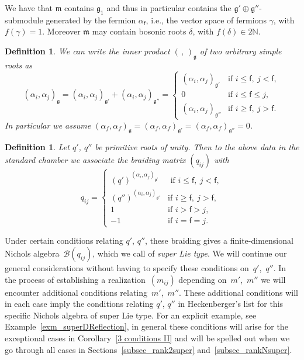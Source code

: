 \documentclass[pdftex]{sigma}%
\numberwithin{equation}{section}
\newtheorem{defin}[teo]{Definition}
\newcommand{\N}{\mathbb{N}}
\newcommand{\f}{\mathsf{f}}
\begin{document}
We have that $\mathfrak{m}$ contains $\mathfrak{g_1}$ and thus in particular contains the $\mathfrak{g'} \oplus \mathfrak{g''}$-submodule generated by the fermion $\alpha_\f$, i.e., the vector space of fermions $\gamma$, with $f(\gamma) =1$.
Moreover $\mathfrak{m}$ may contain bosonic roots $\delta$, with $f(\delta)\in 2\N$.
\begin{defin}We can write the inner product $\left( \,,\,\right)_\mathfrak{g}$ of two arbitrary simple roots as \[(\alpha_{i}, \alpha_{j})_\mathfrak{g} = (\alpha_{i}, \alpha_{j})_\mathfrak{g'}+(\alpha_{i}, \alpha_{j})_\mathfrak{g''}= \begin{cases} (\alpha_{i}, \alpha_{j})_\mathfrak{g'}& \text{if } i \leq \f ,\  j < \f, \\
0 & \text{if } i \leq \f \leq j, \\
(\alpha_{i}, \alpha_{j})_\mathfrak{g''}& \text{if } i \geq \f ,\  j > \f.
\end{cases}\]
In particular we assume $(\alpha_{f}, \alpha_{f})_\mathfrak{g}= (\alpha_{f}, \alpha_{f})_\mathfrak{g'} = (\alpha_{f}, \alpha_{f})_\mathfrak{g''}=0$.
\end{defin}

\begin{defin}\label{defbraidSuper} Let $q'$, $q''$ be primitive roots of unity.
Then to the above data in the standard chamber we associate the braiding matrix $(q_{ij})$
with
\[q_{ij} =
\begin{cases} (q')^{(\alpha_{i}, \alpha_{j})_\mathfrak{g'}}&\text{ if } i \leq \f ,\  j < \f, \\
(q'')^{(\alpha_{i}, \alpha_{j})_\mathfrak{g''}}& \text{if } i \geq \f ,\  j > \f, \\
  1 & \text{if } i>\f>j, \\
-1 & \text{if } i=\f=j.
\end{cases}\]
\end{defin}

Under certain conditions relating $q'$, $q''$, these braiding gives a finite-dimensional Nichols algebra~$\mathcal{B}(q_{ij})$, which we call of \emph{super Lie type}. We will continue our general considerations without having to specify these conditions on~$q'$,~$q''$. In the process of establishing a realization~$(m_{ij})$ depending on~$m'$,~$m''$ we will encounter additional conditions relating~$m'$,~$m''$. These additional conditions will in each case imply the conditions relating $q'$, $q''$ in Heckenberger's list for this specific Nichols algebra of super Lie type. For an explicit example, see Example~\ref{exm_superDReflection}, in general these conditions will arise for the exceptional cases in Corollary~\ref{3 conditions II} and will be spelled out when we go through all cases in Sections~\ref{subsec_rank2super} and~\ref{subsec_rankNsuper}.
\end{document}
